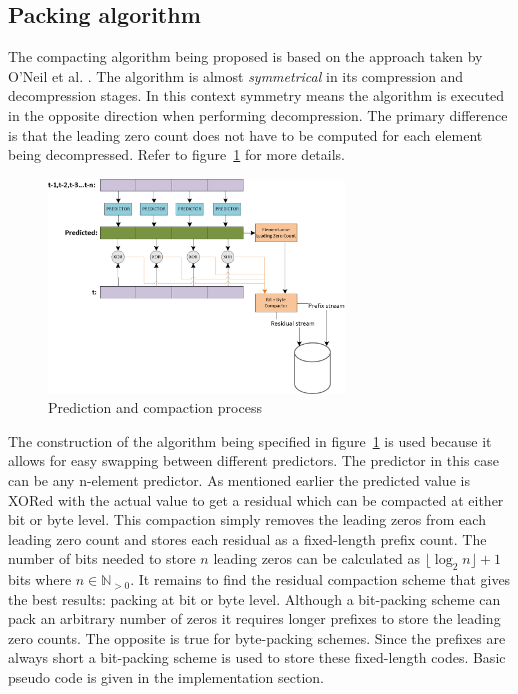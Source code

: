 \subsection{Packing algorithm}
The compacting algorithm being proposed is based on the approach taken by O'Neil et al. \cite{O'Neil:2011:FDC:1964179.1964189}. The algorithm is almost \textit{symmetrical} in its compression and 
decompression stages. In this context symmetry means the algorithm is executed in the opposite direction when performing decompression. The primary difference is that the leading 
zero count does not have to be computed for each element being decompressed. Refer to figure~\ref{PACKING_ALGORITHM} for more details.
\begin{figure}[h!]
\begin{mdframed}
 \centering
 \includegraphics[width=0.7\textwidth]{Thesis_Alg.png}
 \caption{Prediction and compaction process}
 \label{PACKING_ALGORITHM}
\end{mdframed}
\end{figure}
The construction of the algorithm being specified in figure~\ref{PACKING_ALGORITHM} is used because it allows for easy swapping between different predictors. The predictor in this case 
can be any n-element predictor. As mentioned earlier the predicted value is XORed with the actual value to get a residual which can be compacted at either bit or byte level. This 
compaction simply removes the leading zeros from each leading zero count and stores each residual as a fixed-length prefix count. The number of bits needed to store $n$ leading 
zeros can be calculated as $\lfloor\log_2n\rfloor+1$ bits where $n\in\mathbb{N}_{>0}$. It remains to find the residual compaction scheme that gives the best results: packing at 
bit or byte level. Although a bit-packing scheme can pack an arbitrary number of zeros it requires longer prefixes to store the leading zero counts. The opposite is true 
for byte-packing schemes. Since the prefixes are always short a bit-packing scheme is used to store these fixed-length codes. Basic pseudo code is given in the implementation section.

